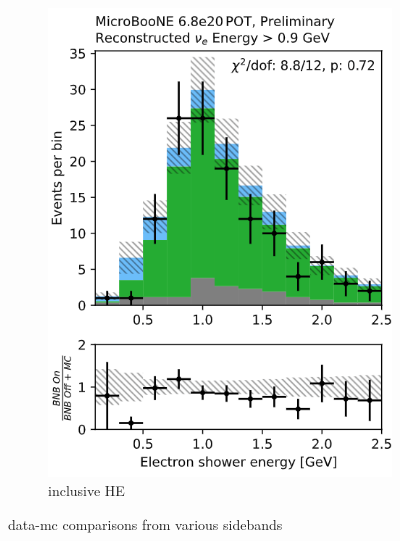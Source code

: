 \begin{figure}[H]
\begin{center}
\begin{subfigure}[b]{0.3\textwidth}
    \caption{\label{fig:datamccomparisons:numu} \npsel \dedx}
    \end{subfigure}
    \begin{subfigure}[b]{0.17\textwidth}
    \centering
    \includegraphics[width=1.00\textwidth]{introduction/inclHE.png}
    \caption{\label{fig:datamccomparisons:pi0} \nue inclusive HE}
    \end{subfigure}
\caption{\label{fig:datamccomparisons3} data-mc comparisons from various sidebands}
\end{center}
\end{figure}

